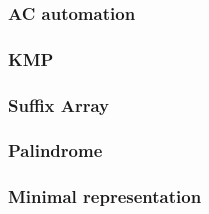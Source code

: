 \subsubsection{AC automation}

\subsubsection{KMP}

\subsubsection{Suffix Array}

\subsubsection{Palindrome}

\subsubsection{Minimal representation}





